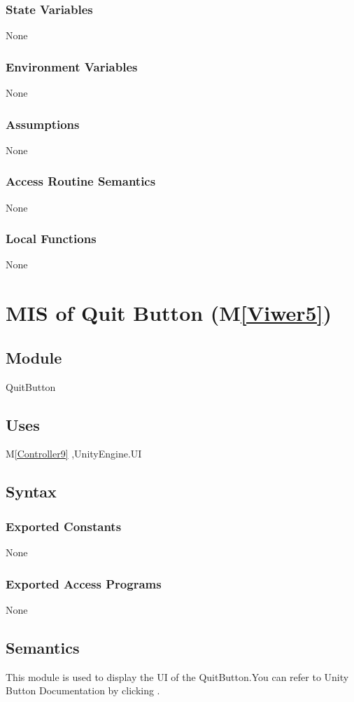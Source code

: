 \documentclass[12pt, titlepage]{article}
\newcommand{\mref}[1]{M\ref{#1}}
\begin{document}
\subsubsection{State Variables}
None
\subsubsection{Environment Variables}
None
\subsubsection{Assumptions}
None
\subsubsection{Access Routine Semantics}
None
\subsubsection{Local Functions}
None

\newpage

\section{MIS of Quit Button (\mref{Viwer5})}

\subsection{Module}
QuitButton

\subsection{Uses}
\mref{Controller9} ,UnityEngine.UI 

\subsection{Syntax}
\subsubsection{Exported Constants}
None
\subsubsection{Exported Access Programs}
None

\subsection{Semantics}
This module is used to display the UI of the QuitButton.You can refer to Unity Button Documentation by clicking \bref.
\end{document}
